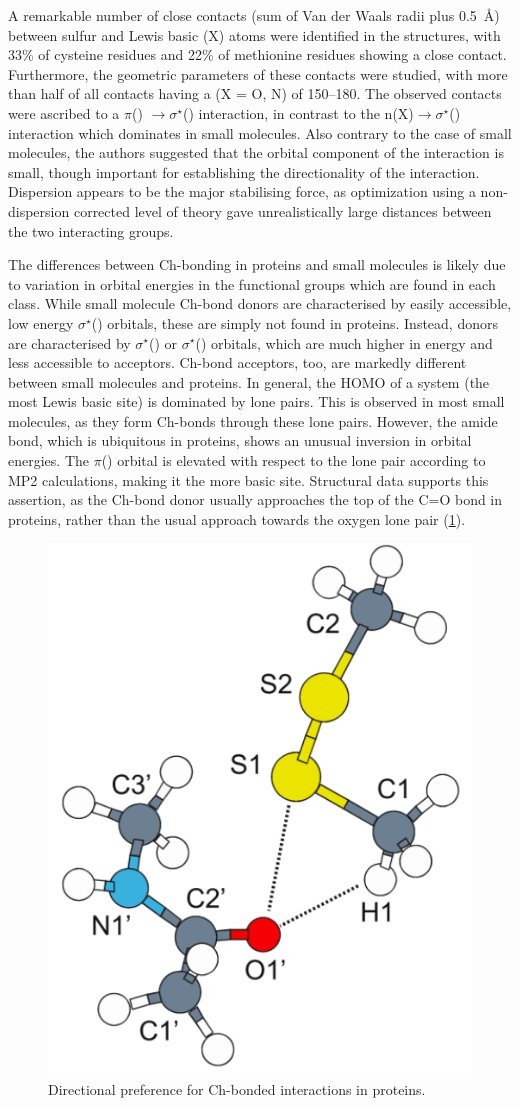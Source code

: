 \begin{refsection}
A remarkable number of close contacts (sum of Van der Waals radii plus 0.5~\AA) between sulfur and Lewis basic (X) atoms were identified in the structures, with 33\% of cysteine residues and 22\% of methionine residues showing a close contact.
Furthermore, the geometric parameters of these contacts were studied, with more than half of all contacts having a  (X = O, N) of 150--180\degree.
The observed contacts were ascribed to a $ \pi $() $ \rightarrow \sigma^{\star} $() interaction, in contrast to the n(X)$ \rightarrow \sigma^{\star} $() interaction which dominates in small molecules.
Also contrary to the case of small molecules, the authors suggested that the orbital component of the interaction is small, though important for establishing the directionality of the interaction.
Dispersion appears to be the major stabilising force, as optimization using a non-dispersion corrected level of theory gave unrealistically large distances between the two interacting groups.

The differences between Ch-bonding in proteins and small molecules is likely due to variation in orbital energies in the functional groups which are found in each class.
While small molecule Ch-bond donors are characterised by easily accessible, low energy $ \sigma^{\star} $() orbitals, these are simply not found in proteins.
Instead, donors are characterised by $ \sigma^{\star} $() or $ \sigma^{\star} $() orbitals, which are much higher in energy and less accessible to acceptors.
Ch-bond acceptors, too, are markedly different between small molecules and proteins.
In general, the HOMO of a system (the most Lewis basic site) is dominated by lone pairs.
This is observed in most small molecules, as they form Ch-bonds through these lone pairs.
However, the amide bond, which is ubiquitous in proteins, shows an unusual inversion in orbital energies.
The $ \pi $() orbital is elevated with respect to the lone pair according to MP2 calculations, making it the more basic site.
Structural data supports this assertion, as the Ch-bond donor usually approaches the top of the C=O bond in proteins, rather than the usual approach towards the oxygen lone pair (\cref{fig:amide-diselenide-ch-bond}).\autocite{Iwaoka2012}

\begin{figure}
    \centering
    \includegraphics[width=0.4\linewidth]{Figures/amide-diselenide-ch-bond.pdf}
    \caption{Directional preference for Ch-bonded interactions in proteins.}\label{fig:amide-diselenide-ch-bond}
\end{figure}


\end{refsection}
